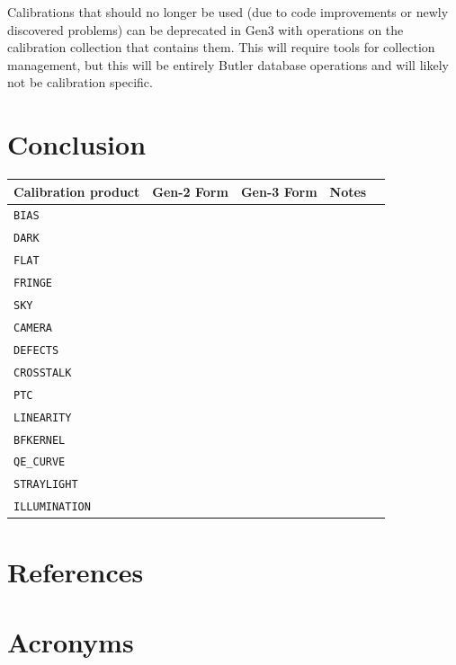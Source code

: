 \documentclass[DM,authoryear,toc]{lsstdoc}
\begin{document}
Calibrations that should no longer be used (due to code improvements
or newly discovered problems) can be deprecated in Gen3 with
operations on the calibration collection that contains them.  This
will require tools for collection management, but this will be
entirely Butler database operations and will likely not be calibration
specific.


\section{Conclusion}


\appendix

\begin{tabular}{l |c|c|l|l}
  Calibration product & Gen-2 Form & Gen-3 Form & Notes \\
  \hline
  \verb|BIAS| & & & \\
  \verb|DARK| & & & \\
  \verb|FLAT| & & & \\
  \verb|FRINGE| & & & \\
  \verb|SKY| & & & \\
  \verb|CAMERA| & & & \\
  \verb|DEFECTS| & & & \\
  \verb|CROSSTALK| & & & \\
  \verb|PTC| & & & \\
  \verb|LINEARITY| & & & \\
  \verb|BFKERNEL| & & & \\
  \verb|QE_CURVE| & & & \\
  \verb|STRAYLIGHT| & & & \\
  \verb|ILLUMINATION| & & & \\
\end{tabular}

\section{References} \label{sec:bib}


\section{Acronyms} \label{sec:acronyms}

\end{document}
